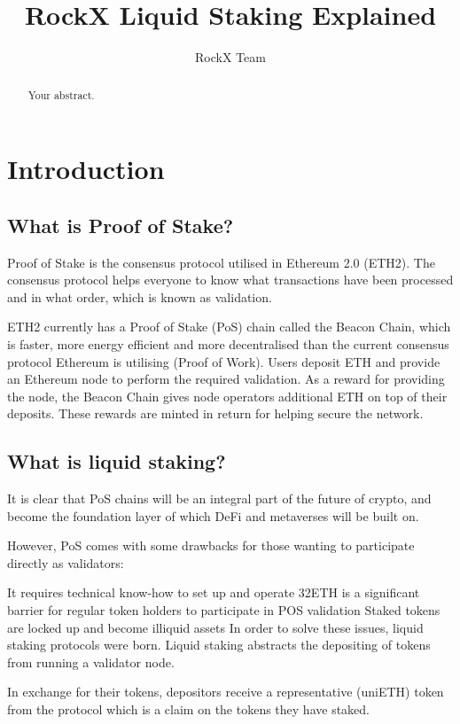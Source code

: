 \documentclass{article}
\title{RockX Liquid Staking Explained}
\author{RockX Team}
\begin{document}
\maketitle

\begin{abstract}
Your abstract.
\end{abstract}

\section{Introduction}

\subsection{What is Proof of Stake?}

Proof of Stake is the consensus protocol utilised in Ethereum 2.0 (ETH2). The consensus protocol helps everyone to know what transactions have been processed and in what order, which is known as validation.

ETH2 currently has a Proof of Stake (PoS) chain called the Beacon Chain, which is faster, more energy efficient and more decentralised than the current consensus protocol Ethereum is utilising (Proof of Work). Users deposit ETH and provide an Ethereum node to perform the required validation. As a reward for providing the node, the Beacon Chain gives node operators additional ETH on top of their deposits. These rewards are minted in return for helping secure the network.

\subsection{What is liquid staking?}

It is clear that PoS chains will be an integral part of the future of crypto, and become the foundation layer of which DeFi and metaverses will be built on.

However, PoS comes with some drawbacks for those wanting to participate directly as validators:

It requires technical know-how to set up and operate
32ETH is a significant barrier for regular token holders to participate in POS validation
Staked tokens are locked up and become illiquid assets
In order to solve these issues, liquid staking protocols were born. Liquid staking abstracts the depositing of tokens from running a validator node.

In exchange for their tokens, depositors receive a representative (uniETH) token from the protocol which is a claim on the tokens they have staked.
\end{document}
